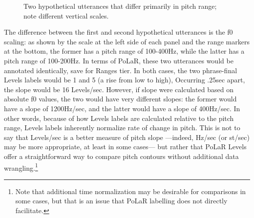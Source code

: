 \documentclass[11pt, twoside]{memoir}
\begin{document}
\begin{figure}[H]
%
\caption{Two hypothetical utterances that differ primarily in pitch range; note different vertical scales.%
\label{fig:Usages-slopes}%
}
\end{figure}

The difference between the first and second hypothetical utterances is the f0 scaling: as shown by the scale at the left side of each panel and the range markers at the bottom, the former has a pitch range of 100-400Hz, while the latter has a pitch range of 100-200Hz. In terms of PoLaR, these two utterances would be annotated identically, save for Ranges tier. In both cases, the two phrase-final Levels labels would be 1 and 5 (a rise from low to high), Occurring .25sec apart, the slope would be 16 Levels/sec. However, if slope were calculated based on absolute f0 values, the two would have very different slopes: the former would have a slope of 1200Hz/sec, and the latter would have a slope of 400Hz/sec. In other words, because of how Levels labels are calculated relative to the pitch range, Levels labels inherently normalize rate of change in pitch. This is not to say that Levels/sec is a better measure of pitch slope —indeed, Hz/sec (or st/sec) may be more appropriate, at least in some cases— but rather that PoLaR Levels offer a straightforward way to compare pitch contours without additional data wrangling.\footnote{Note that additional time normalization may be desirable for comparisons in some cases, but that is an issue that PoLaR labelling does not directly facilitate.}
\end{document}
